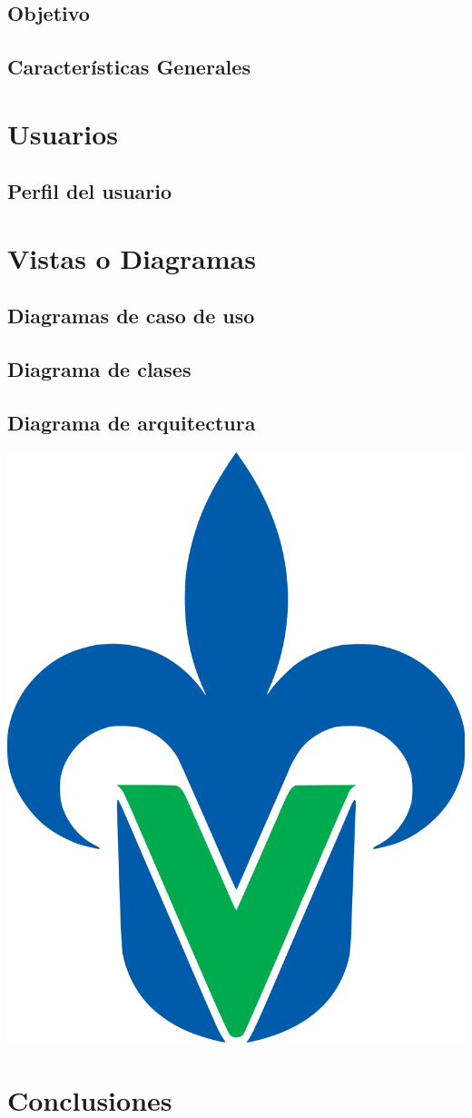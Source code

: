 \documentclass[12pt,a4paper]{article}
\begin{document}
\subsection{Objetivo}

\subsection{Características Generales}

\section{Usuarios}
\subsection{Perfil del usuario}

\section{Vistas o Diagramas}
\subsection{Diagramas de caso de uso}

\subsection{Diagrama de clases}

\subsection{Diagrama de arquitectura}
\includegraphics[scale=0.1]{uvlogo}


	 	
\section{Conclusiones} 
	 
  
\end{document}

